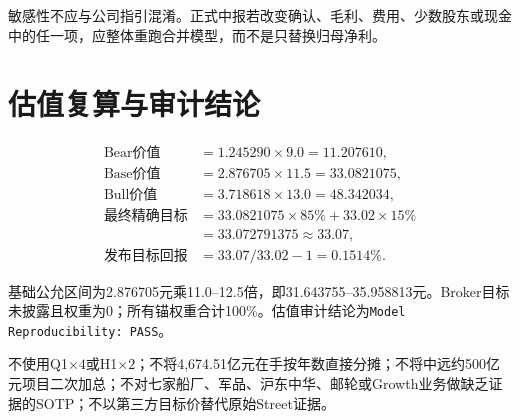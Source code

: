 敏感性不应与公司指引混淆。正式中报若改变确认、毛利、费用、少数股东或现金中的任一项，应整体重跑合并模型，而不是只替换归母净利。

\section{估值复算与审计结论}

\begin{align*}
\text{Bear价值}&=1.245290\times9.0=11.207610,\\
\text{Base价值}&=2.876705\times11.5=33.0821075,\\
\text{Bull价值}&=3.718618\times13.0=48.342034,\\
\text{最终精确目标}&=33.0821075\times85\%+33.02\times15\%\\
&=33.072791375\approx33.07,\\
\text{发布目标回报}&=33.07/33.02-1=0.1514\%.
\end{align*}

基础公允区间为2.876705元乘11.0--12.5倍，即31.643755--35.958813元。Broker目标未披露且权重为0；所有锚权重合计100\%。估值审计结论为\texttt{Model Reproducibility: PASS}。

\begin{riskbox}[模型禁止项]
不使用Q1\(\times4\)或H1\(\times2\)；不将4,674.51亿元在手按年数直接分摊；不将中远约500亿元项目二次加总；不对七家船厂、军品、沪东中华、邮轮或Growth业务做缺乏证据的SOTP；不以第三方目标价替代原始Street证据。
\end{riskbox}
